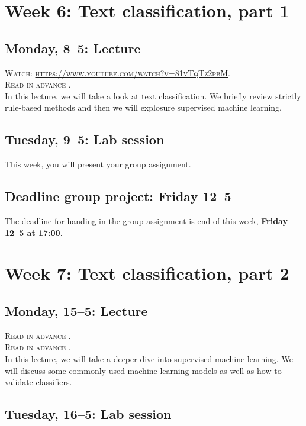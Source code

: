 \section*{Week 6: Text classification, part 1}

\subsection*{Monday, 8--5: Lecture}
\textsc{ Watch: \url{https://www.youtube.com/watch?v=81vTqTz2pbM}.}\\
\textsc{ Read in advance \cite{van_zoonen_social_2016}.}\\

In this lecture, we will take a look at text classification. We briefly review strictly rule-based methods and then we will explosure supervised machine learning.

\subsection*{Tuesday, 9--5: Lab session}
This week, you will present your group assignment. 

\subsection*{Deadline group project: Friday 12--5}
The deadline for handing in the group assignment is end of this week, \textbf{Friday 12--5 at 17:00}.

\section*{Week 7: Text classification, part 2}
\subsection*{Monday, 15--5: Lecture}
\textsc{ Read in advance \cite{jordan_mitchell}.} \\
\textsc{ Read in advance \cite{meppelink_reliable_2021}.}\\

In this lecture, we will take a deeper dive into supervised machine learning. We will discuss some commonly used machine learning models as well as how to validate classifiers.

\subsection*{Tuesday, 16--5: Lab session}

